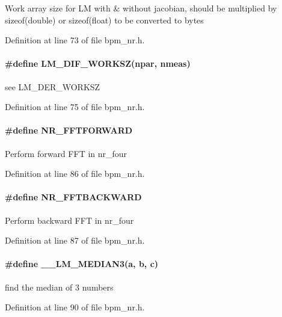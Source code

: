 Work array size for LM with \& without jacobian, should be multiplied by sizeof(double) or sizeof(float) to be converted to bytes 

Definition at line 73 of file bpm\_\-nr.h.
\paragraph[LM\_\-DIF\_\-WORKSZ]{\setlength{\rightskip}{0pt plus 5cm}\#define LM\_\-DIF\_\-WORKSZ(npar, \/  nmeas)}\hfill\label{group__nr_gf0bb136aa59cf5223bfa544c9318312e}


see LM\_\-DER\_\-WORKSZ 

Definition at line 75 of file bpm\_\-nr.h.
\paragraph[NR\_\-FFTFORWARD]{\setlength{\rightskip}{0pt plus 5cm}\#define NR\_\-FFTFORWARD}\hfill\label{group__nr_g7a1c3d54c242a88af1275529f6532e93}


Perform forward FFT in nr\_\-four 

Definition at line 86 of file bpm\_\-nr.h.
\paragraph[NR\_\-FFTBACKWARD]{\setlength{\rightskip}{0pt plus 5cm}\#define NR\_\-FFTBACKWARD}\hfill\label{group__nr_g3e14fd94b3a50fac24a0420ecf0c2b55}


Perform backward FFT in nr\_\-four 

Definition at line 87 of file bpm\_\-nr.h.
\paragraph[\_\-\_\-LM\_\-MEDIAN3]{\setlength{\rightskip}{0pt plus 5cm}\#define \_\-\_\-LM\_\-MEDIAN3(a, \/  b, \/  c)}\hfill\label{group__nr_g3d949f95e6f4158ed1392a42c0960723}


find the median of 3 numbers 

Definition at line 90 of file bpm\_\-nr.h.

